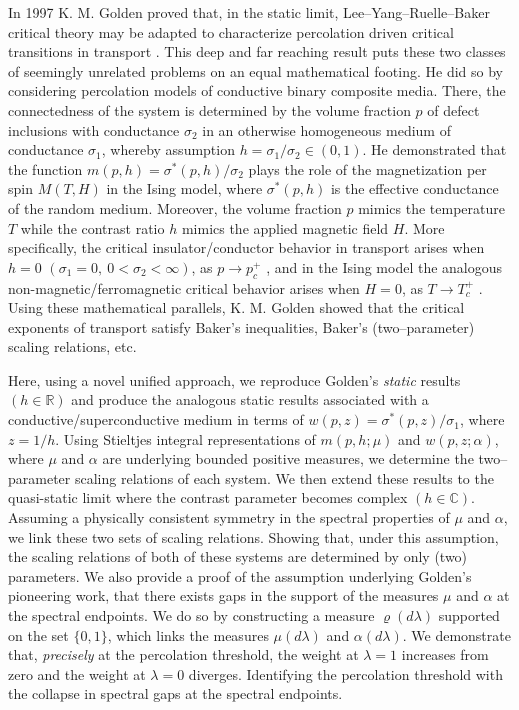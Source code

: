 \documentclass[english,12pt,jmp,graphicx]{revtex4-1}
\begin{document}
  
In 1997 K. M. Golden proved that, in the static limit,
Lee--Yang--Ruelle--Baker critical theory may be adapted to
characterize percolation driven critical transitions in transport  
\cite{Golden:PRL-3935}. This deep and far reaching result puts these
two classes of seemingly unrelated problems on an equal mathematical
footing. He did so by considering percolation models of  
conductive binary composite media. There, the connectedness of the
system is determined by the volume fraction $p$ of defect inclusions
with conductance $\sigma_2$ in an otherwise homogeneous medium of
conductance $\sigma_1$, whereby assumption $h=\sigma_1/\sigma_2\in(0,1)$. He
demonstrated that the function $m(p,h)=\sigma^*(p,h)/\sigma_2$ plays the role of
the magnetization per spin $M(T,H)$ in the Ising model, where
$\sigma^*(p,h)$ is the effective conductance of the random medium. Moreover,
the volume fraction $p$ mimics the temperature $T$ while the contrast
ratio $h$ mimics the applied magnetic field $H$. More specifically,
the critical insulator/conductor behavior in transport arises when
$h=0$ $(\sigma_1=0, \ 0<\sigma_2<\infty)$, as $p\to p_c^+$ \cite{Golden:PRL-3935}, and
in the Ising model the analogous non-magnetic/ferromagnetic critical
behavior arises when $H=0$, as $T\to T_c^+$
\cite{Christensen-2005}. Using these mathematical parallels,
K. M. Golden showed that the critical exponents of transport satisfy
Baker's inequalities, Baker's (two--parameter) scaling relations, etc.

Here, using a novel unified approach, we reproduce Golden's
\emph{static} results $(h\in\mathbb{R})$ and produce the analogous
static results associated with a conductive/superconductive medium in
terms of $w(p,z)=\sigma^*(p,z)/\sigma_1$, where $z=1/h$. Using Stieltjes integral
representations of $m(p,h;\mu)$ and $w(p,z;\alpha)$, where $\mu$ and $\alpha$ are
underlying bounded positive measures, we determine the two--parameter
scaling relations of each system. We then extend these results to the
quasi-static limit where the contrast parameter becomes complex
$(h\in\mathbb{C})$. Assuming a physically consistent symmetry in the
spectral properties of $\mu$ and $\alpha$, we link these two sets of scaling
relations. Showing that, under this assumption, the scaling relations
of both of these systems are determined by only (two) parameters. We
also provide a proof of the assumption underlying Golden's pioneering
work, that there exists gaps in the support of the measures
$\mu$ and $\alpha$ at the spectral endpoints. We do so by constructing a
measure $\varrho(d\lambda)$ supported on the set $\{0,1\}$, which links the measures
$\mu(d\lambda)$ and $\alpha(d\lambda)$. We demonstrate that, \emph{precisely} at the
percolation threshold, the weight at $\lambda=1$ increases from zero and the
weight at $\lambda=0$ diverges. Identifying the percolation threshold with
the collapse in spectral gaps at the spectral endpoints.
\end{document}
